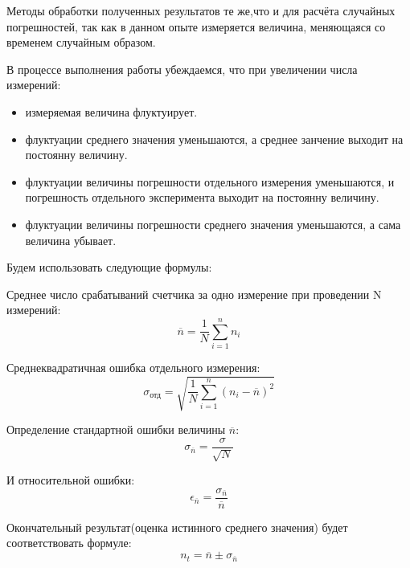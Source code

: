 Методы обработки полученных результатов те же,что и для расчёта случайных погрешностей, так как в данном опыте измеряется величина, меняющаяся со временем случайным образом.


В процессе выполнения работы убеждаемся, что при увеличении числа измерений:

\begin{itemize}
    \item измеряемая величина флуктуирует.

    \item флуктуации среднего значения уменьшаются, а среднее занчение выходит на постоянну величину.

    \item флуктуации величины погрешности отдельного измерения уменьшаются, и погрешность отдельного эксперимента выходит на постоянну величину.

    \item флуктуации величины погрешности среднего значения уменьшаются, а сама величина убывает.

\end{itemize}



Будем использовать следующие формулы:

Среднее число срабатываний счетчика за одно измерение при проведении N измерений:
\begin{equation}
    \overline{n} = \frac{1}{N}\sum\limits_{i=1}^n n_i
\end{equation}


Среднеквадратичная ошибка отдельного измерения:
\begin{equation}
    \sigma_\text{отд} = \sqrt{\frac{1}{N}\sum\limits_{i=1}^n (n_i-\overline{n})^2}
\end{equation}


Определение стандартной ошибки величины $\overline{n}$:
\begin{equation}
    \sigma_{\overline{n}} = \frac{\sigma}{\sqrt{N}}
\end{equation}


И относительной ошибки:
\begin{equation}
    \epsilon_{\overline{n}} = \frac{\sigma_{\overline{n}}}{\overline{n}}
\end{equation}


Окончательный результат(оценка истинного среднего значения) будет соответствовать формуле:
\begin{equation}
    n_t = \overline{n} \pm \sigma_{\overline{n}}
\end{equation}



